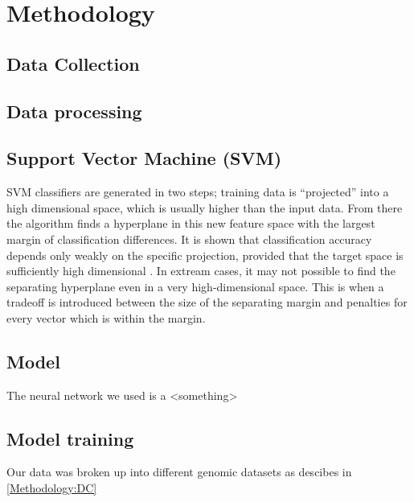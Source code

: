 \section{Methodology}

\subsection*{Data Collection}
\label{Methodology:DC}

\subsection*{Data processing}

\subsection*{Support Vector Machine (SVM)}
\label{Methodology:SVM_model}
SVM classifiers are generated in two steps; training data is ``projected'' into a high dimensional space, which is usually higher than the input data. From there the algorithm finds a hyperplane in this new feature space with the largest margin of classification differences. It is shown that classification accuracy depends only weakly on the specific projection, provided that the target space is sufficiently high dimensional \cite{cortes1995support}. In extream cases, it may not possible to find the separating hyperplane even in a very high-dimensional space. This is when a tradeoff is introduced between the size of the separating margin and penalties for every vector which is
within the margin.


\subsection*{Model}
\label{Methodology:1DCNN_model}

The neural network we used is a <something>

\subsection*{Model training}

Our data was broken up into different genomic datasets as descibes in \ref{Methodology:DC}